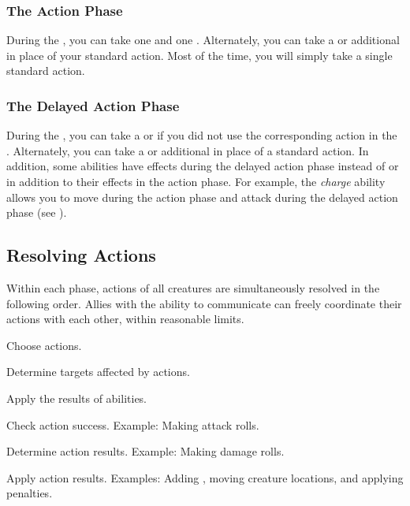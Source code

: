         \subsubsection{The Action Phase}\label{The Action Phase}
            During the , you can take one  and one .
            Alternately, you can take a  or additional  in place of your standard action.
            Most of the time, you will simply take a single standard action.

        \subsubsection{The Delayed Action Phase}\label{The Delayed Action Phase}
            During the , you can take a  or  if you did not use the corresponding action in the .
            Alternately, you can take a  or additional  in place of a standard action.
            In addition, some abilities have effects during the delayed action phase instead of or in addition to their effects in the action phase.
            For example, the \textit{charge} ability allows you to move during the action phase and attack during the delayed action phase (see ).

    \subsection{Resolving Actions}\label{Resolving Actions}

        Within each phase, actions of all creatures are simultaneously resolved in the following order.
        Allies with the ability to communicate can freely coordinate their actions with each other, within reasonable limits.

        \begin{enumerate*}
            \item Choose actions.
            \item Determine targets affected by actions.
            \item Apply the results of  abilities.
            \item Check action success.
                Example: Making attack rolls.
            \item Determine action results.
                Example: Making damage rolls.
            \item Apply action results.
                Examples: Adding , moving creature locations, and applying penalties.
        \end{enumerate*}

